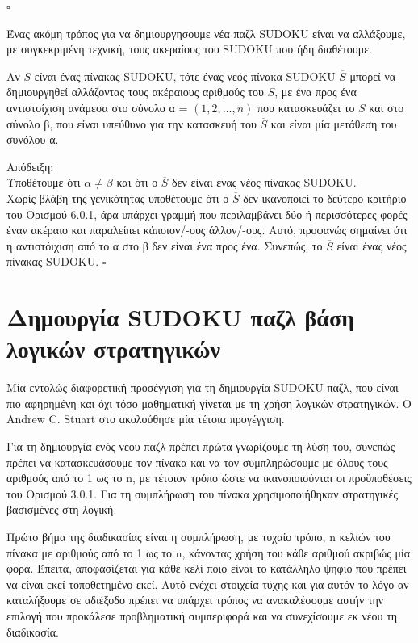 \documentclass[12pt]{book}
\theoremstyle{definition}
\begin{document}
\(\square\)

Ένας ακόμη τρόπος για να δημιουργησουμε νέα παζλ SUDOKU είναι να αλλάξουμε, με συγκεκριμένη τεχνική, τους ακεραίους του SUDOKU που ήδη διαθέτουμε. \par

\begin{theorem}{}{}
	Αν \(S\) είναι ένας πίνακας SUDOKU, τότε ένας νεός πίνακα SUDOKU \(\overline{S}\) μπορεί να δημιουργηθεί αλλάζοντας τους ακέραιους αριθμούς του \(S\), με ένα προς ένα αντιστοίχιση ανάμεσα στο σύνολο α = \(\left( 1,2,\dots,n\right)\) που κατασκευάζει το \(S\) και στο σύνολο β, που είναι υπεύθυνο για την κατασκευή του \(\overline{S}\) και είναι μία μετάθεση του συνόλου α.
\end{theorem}

Απόδειξη: \\
Υποθέτουμε ότι \(α \neq β\) και ότι ο \(\overline{S}\) δεν είναι ένας νέος πίνακας SUDOKU. \\

Χωρίς βλάβη της γενικότητας υποθέτουμε ότι ο \(\overline{S}\) δεν ικανοποιεί το δεύτερο κριτήριο του Ορισμού 6.0.1, άρα υπάρχει γραμμή που περιλαμβάνει δύο ή περισσότερες φορές έναν ακέραιο και παραλείπει κάποιον/-ους άλλον/-ους. Αυτό, προφανώς σημαίνει ότι η αντιστόιχιση από το α στο β δεν είναι ένα προς ένα. Συνεπώς, το \(\overline{S}\) είναι ένας νέος πίνακας SUDOKU. \(\square\)

\section{Δημουργία SUDOKU παζλ βάση λογικών στρατηγικών}

Μία εντολώς διαφορετική προσέγγιση για τη δημιουργία SUDOKU παζλ, που είναι πιο αφηρημένη και όχι τόσο μαθηματική γίνεται με τη χρήση λογικών στρατηγικών. Ο Andrew C. Stuart στο \cite{9} ακολούθησε μία τέτοια προγέγγιση. \par

Για τη δημιουργία ενός νέου παζλ πρέπει πρώτα γνωρίζουμε τη λύση του, συνεπώς πρέπει να κατασκευάσουμε τον πίνακα και να τον συμπληρώσουμε με όλους τους αριθμούς από το 1 ως το n, με τέτοιον τρόπο ώστε να ικανοποιούνται οι προϋποθέσεις του Ορισμού 3.0.1. Για τη συμπλήρωση του πίνακα χρησιμοποιήθηκαν στρατηγικές βασισμένες στη λογική. \par

Πρώτο βήμα της διαδικασίας είναι η συμπλήρωση, με τυχαίο τρόπο, n κελιών του πίνακα με αριθμούς από το 1 ως το n, κάνοντας χρήση του κάθε αριθμού ακριβώς μία φορά. Έπειτα, αποφασίζεται για κάθε κελί ποιο είναι το κατάλληλο ψηφίο που πρέπει να είναι εκεί τοποθετημένο εκεί. Αυτό ενέχει στοιχεία τύχης και για αυτόν το λόγο αν καταλήξουμε σε αδιέξοδο πρέπει να υπάρχει τρόπος να ανακαλέσουμε αυτήν την επιλογή που προκάλεσε προβληματική συμπεριφορά και να συνεχίσουμε εκ νέου τη διαδικασία. \par
\end{document}

